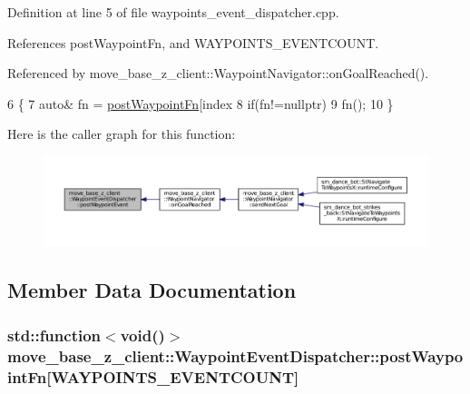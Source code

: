 Definition at line 5 of file waypoints\+\_\+event\+\_\+dispatcher.\+cpp.



References post\+Waypoint\+Fn, and W\+A\+Y\+P\+O\+I\+N\+T\+S\+\_\+\+E\+V\+E\+N\+T\+C\+O\+U\+NT.



Referenced by move\+\_\+base\+\_\+z\+\_\+client\+::\+Waypoint\+Navigator\+::on\+Goal\+Reached().


\begin{DoxyCode}
6 \{
7     \textcolor{keyword}{auto}& fn = \hyperlink{classmove__base__z__client_1_1WaypointEventDispatcher_acc538eb7506c13f7cca2268a1742dadd}{postWaypointFn}[index %
8     \textcolor{keywordflow}{if}(fn!=\textcolor{keyword}{nullptr})
9         fn();
10 \}
\end{DoxyCode}


Here is the caller graph for this function\+:
\nopagebreak
\begin{figure}[H]
\begin{center}
\leavevmode
\includegraphics[width=350pt]{classmove__base__z__client_1_1WaypointEventDispatcher_a7421f1eb8aae15a3ddde7c50bea87648_icgraph}
\end{center}
\end{figure}




\subsection{Member Data Documentation}
\subsubsection[{\texorpdfstring{post\+Waypoint\+Fn}{postWaypointFn}}]{\setlength{\rightskip}{0pt plus 5cm}std\+::function$<$void()$>$ move\+\_\+base\+\_\+z\+\_\+client\+::\+Waypoint\+Event\+Dispatcher\+::post\+Waypoint\+Fn\mbox{[}{\bf W\+A\+Y\+P\+O\+I\+N\+T\+S\+\_\+\+E\+V\+E\+N\+T\+C\+O\+U\+NT}\mbox{]}\hspace{0.3cm}{\ttfamily [private]}}\hypertarget{classmove__base__z__client_1_1WaypointEventDispatcher_acc538eb7506c13f7cca2268a1742dadd}{}\label{classmove__base__z__client_1_1WaypointEventDispatcher_acc538eb7506c13f7cca2268a1742dadd}


